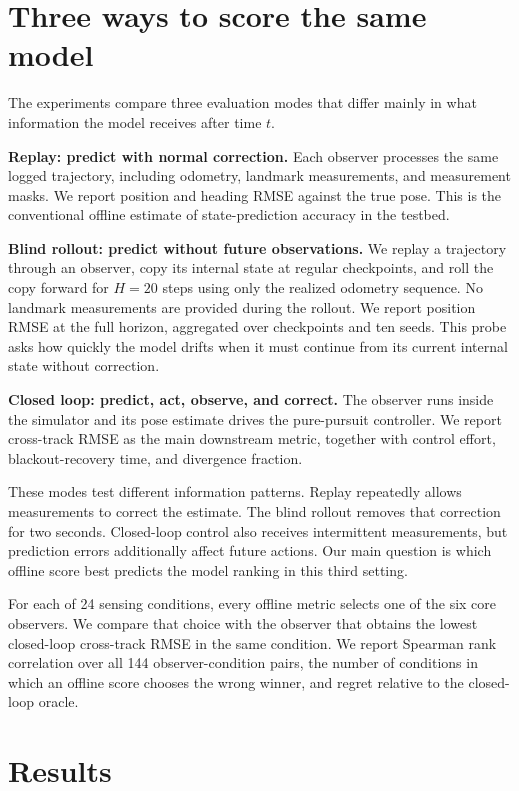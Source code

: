 \documentclass{article}
\begin{document}
\section{Three ways to score the same model}
\label{sec:evaluation}

The experiments compare three evaluation modes that differ mainly in what information the model receives after time $t$.

\textbf{Replay: predict with normal correction.} Each observer processes the same logged trajectory, including odometry, landmark measurements, and measurement masks. We report position and heading RMSE against the true pose. This is the conventional offline estimate of state-prediction accuracy in the testbed.

\textbf{Blind rollout: predict without future observations.} We replay a trajectory through an observer, copy its internal state at regular checkpoints, and roll the copy forward for $H=20$ steps using only the realized odometry sequence. No landmark measurements are provided during the rollout. We report position RMSE at the full horizon, aggregated over checkpoints and ten seeds. This probe asks how quickly the model drifts when it must continue from its current internal state without correction.

\textbf{Closed loop: predict, act, observe, and correct.} The observer runs inside the simulator and its pose estimate drives the pure-pursuit controller. We report cross-track RMSE as the main downstream metric, together with control effort, blackout-recovery time, and divergence fraction.

These modes test different information patterns. Replay repeatedly allows measurements to correct the estimate. The blind rollout removes that correction for two seconds. Closed-loop control also receives intermittent measurements, but prediction errors additionally affect future actions. Our main question is which offline score best predicts the model ranking in this third setting.

For each of 24 sensing conditions, every offline metric selects one of the six core observers. We compare that choice with the observer that obtains the lowest closed-loop cross-track RMSE in the same condition. We report Spearman rank correlation over all 144 observer-condition pairs, the number of conditions in which an offline score chooses the wrong winner, and regret relative to the closed-loop oracle.

\section{Results}
\end{document}
